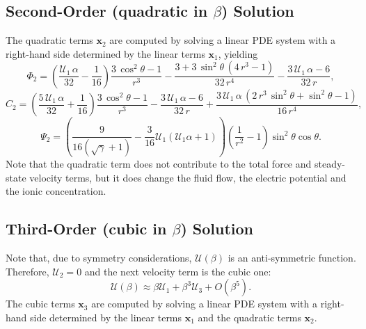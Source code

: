 \documentclass[MSc,beforeExam]{iitcsthesis}
\newcommand{\pars}[1]{\left(#1\right)}
\newcommand\bx{\boldsymbol{x}}
\newcommand\cU{\mathscr{U}}
\begin{document}
\subsection{Second-Order (quadratic in $\beta$) Solution} \label{app:quadratic}
The quadratic terms $\bx_2$ are computed by solving a linear PDE system 
with a right-hand side determined by the linear terms $\bx_1$, yielding
\begin{equation}
\varPhi_2 = \pars{\frac{\cU_1\, \alpha}{32} - \frac{1}{16}}
\frac{3\, {\cos^2\theta} - 1}{r^3} - \frac{3 + 3\, {\sin^2\theta}\, \left(4\, r^3 - 1\right)}{32\, r^4} - \frac{3\, \cU_1\, \alpha - 6}{32\, r},
\end{equation}
\begin{equation}
C_2 = \left(\frac{5\, \cU_1\, \alpha}{32} + \frac{1}{16}\right)
\frac{3\, {\cos^2\theta} - 1}{r^3} - \frac{3\, \cU_1\, \alpha - 6}{32\, r} + \frac{3\, \cU_1\, \alpha\, \left(2\, r^3\, {\sin^2\theta} + {\sin^2\theta} - 1\right)}{16\, r^4},
\end{equation}
\begin{equation}
\Psi_2 = \pars{\frac{9}{16(\sqrt{\gamma}+1)} - \frac{3}{16} \cU_1 (\cU_1 \alpha + 1)}
 \left(\frac{1}{r^2} - 1\right) \sin^2\theta \cos\theta.
\end{equation}
Note that the quadratic term does not contribute to the total force and steady-state 
velocity terms, but it does change the fluid flow, 
the electric potential and the ionic concentration.

\subsection{Third-Order (cubic in $\beta$) Solution} \label{app:cubic}
Note that, due to symmetry considerations, $\cU(\beta)$ is an anti-symmetric function.
Therefore, $\cU_2 = 0$ and the next velocity term is the cubic one:
\begin{equation} \label{eq:cubic}
\cU(\beta) \approx \beta \cU_1 + \beta^3 \cU_3 + O(\beta^5).
\end{equation}
The cubic terms $\bx_3$ are computed by solving a linear PDE system 
with a right-hand side determined by the linear terms $\bx_1$ and the quadratic terms $\bx_2$.
\end{document}
